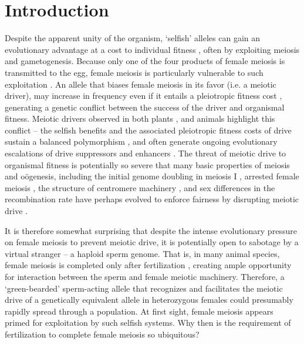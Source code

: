 \documentclass[12pt,letterpaper]{article}
\begin{document}
\section*{Introduction}
Despite the apparent unity of the organism, `selfish' alleles can
gain an evolutionary advantage at a cost to  individual fitness
\citep{Burt2006}, often by exploiting meiosis and gametogenesis.
Because only one of the four products of female meiosis is transmitted to the egg, female meiosis is particularly vulnerable to such exploitation \citep{Sandler1957,Pardo-ManuelDeVillena2001a}. 
An allele that biases female meiosis in its favor (i.e. a meiotic driver), may increase in frequency even if it entails a pleiotropic fitness cost \citep{Prout1973}, generating a genetic conflict between the success of the driver and organismal fitness.
Meiotic drivers observed in both plants
\citep{Buckler1999,Fishman2005,Fishman2008}, and animals
\citep{Agulnik1990,Wu2005,Pardo-ManuelDeVillena2001c} highlight this
conflict -- the selfish benefits and the associated
pleiotropic fitness costs of drive sustain a balanced polymorphism
\citep{Prout1973}, 
and often generate ongoing evolutionary escalations of drive suppressors and enhancers \citep{Dawe1996,Fishman2008}. 
The threat of meiotic drive to organismal fitness is potentially so
severe that many basic properties of
meiosis and o\"{o}genesis, including the initial genome doubling in
meiosis I \citep{Haig1991}, arrested female meiosis
\citep{Mira1998}, the structure of centromere machinery \citep{Malik2002a,Malik2009}, and sex differences in the recombination rate \citep{Haig2010,Brandvain2012} 
have perhaps evolved to enforce fairness by disrupting meiotic drive \citep{Rice2013}.

It is therefore somewhat surprising that despite the intense evolutionary pressure on female meiosis to prevent meiotic drive, 
it is potentially open to sabotage by a virtual stranger -- a haploid sperm genome.
That is, in many animal species, female meiosis is completed only after fertilization \citep{Masui_book}, 
creating ample opportunity for interaction between the sperm and female meiotic machinery. 
Therefore, a `green-bearded' \citep{Gardner2010} sperm-acting allele that recognizes and facilitates the meiotic drive of a genetically equivalent allele in heterozygous females %
     could presumably rapidly spread through a population. 
At first sight, female meiosis appears primed for exploitation by such selfish systems.  
Why then is the requirement of fertilization to complete female meiosis so ubiquitous? 
\end{document}
